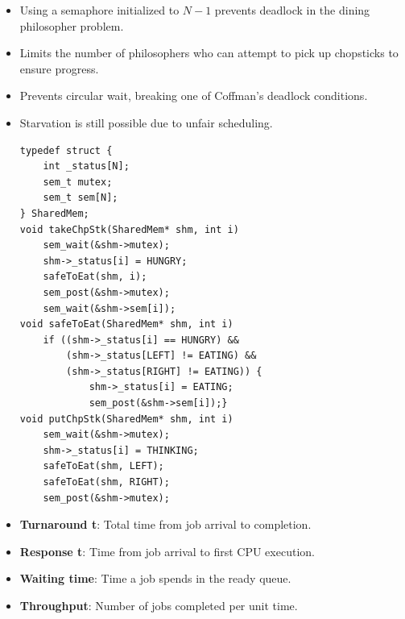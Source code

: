 \documentclass[8pt,twocolumn]{article}
\begin{document}
\begin{itemize}
    \setlength{\itemsep}{0pt} %
    \setlength{\parskip}{0pt}
    \item Using a semaphore initialized to \( N - 1 \) prevents deadlock in the dining philosopher problem.
    \item Limits the number of philosophers who can attempt to pick up chopsticks to ensure progress.
    \item Prevents circular wait, breaking one of Coffman’s deadlock conditions.
    \item Starvation is still possible due to unfair scheduling.
\vspace{-0.6em}
\begin{lstlisting}
typedef struct {
    int _status[N];
    sem_t mutex;
    sem_t sem[N]; 
} SharedMem;
void takeChpStk(SharedMem* shm, int i) 
    sem_wait(&shm->mutex);
    shm->_status[i] = HUNGRY;
    safeToEat(shm, i);
    sem_post(&shm->mutex);
    sem_wait(&shm->sem[i]);            
void safeToEat(SharedMem* shm, int i) 
    if ((shm->_status[i] == HUNGRY) &&
        (shm->_status[LEFT] != EATING) &&
        (shm->_status[RIGHT] != EATING)) {
            shm->_status[i] = EATING;
            sem_post(&shm->sem[i]);} 
void putChpStk(SharedMem* shm, int i) 
    sem_wait(&shm->mutex);
    shm->_status[i] = THINKING;
    safeToEat(shm, LEFT);
    safeToEat(shm, RIGHT);
    sem_post(&shm->mutex);            
\end{lstlisting}
\vspace{-1.5em}
\end{itemize}
\begin{itemize}
    \setlength{\itemsep}{0pt} %
    \setlength{\parskip}{0pt}
    \item \textbf{Turnaround t}: Total time from job arrival to completion.
    \item \textbf{Response t}: Time from job arrival to first CPU execution.
    \item \textbf{Waiting time}: Time a job spends in the ready queue.
    \item \textbf{Throughput}: Number of jobs completed per unit time.
\end{itemize}
\vspace{-0.6em}
\end{document}
